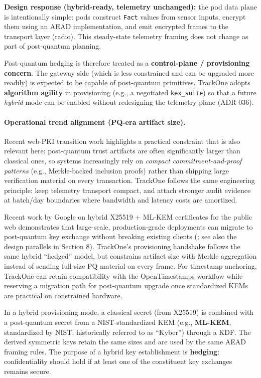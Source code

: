 \textbf{Design response (hybrid-ready, telemetry unchanged):}
the pod data plane is intentionally simple: pods construct \texttt{Fact} values from sensor inputs, encrypt them using
an \ac{AEAD} implementation, and emit encrypted frames to the transport layer (radio).
This steady-state telemetry framing
does not change as part of post-quantum planning.

Post-quantum hedging is therefore treated as a \textbf{control-plane / provisioning concern}. The gateway side (which is
less constrained and can be upgraded more readily) is expected to be capable of post-quantum primitives. TrackOne
adopts \textbf{algorithm agility} in provisioning (e.g., a negotiated \texttt{kex\_suite}) so that a future \emph{hybrid}
mode can be enabled without redesigning the telemetry plane (ADR-036).

\paragraph{Operational trend alignment (PQ-era artifact size).}
Recent web-PKI transition work highlights a practical constraint that is also relevant here:
post-quantum trust artifacts are often significantly larger than classical ones, so systems increasingly rely on
\emph{compact commitment-and-proof patterns} (e.g., Merkle-backed inclusion proofs) rather than shipping large
verification material on every transaction.
TrackOne follows the same engineering principle:
keep telemetry transport compact, and attach stronger audit evidence at batch/day boundaries where bandwidth and
latency costs are amortized.

Recent work by Google on hybrid X25519 + ML-KEM certificates for the public
web demonstrates that large-scale, production-grade deployments can migrate to
post-quantum key exchange without breaking existing clients
(\cite{ars2026_google_pq_https}; see also the design parallels in
\cite{rfc9162} Section 8). TrackOne's provisioning handshake follows the same
hybrid ``hedged'' model, but constrains artifact size with Merkle aggregation
instead of sending full-size PQ material on every frame. For timestamp
anchoring, TrackOne can retain compatibility with the OpenTimestamps workflow
\cite{opentimestamps} while reserving a migration path for post-quantum upgrade
once standardized KEMs are practical on constrained hardware.

In a hybrid provisioning mode, a classical secret (from X25519) is combined with a post-quantum secret from a
NIST-standardized KEM (e.g., \textbf{ML-KEM}, standardized by NIST; historically referred to as ``Kyber'') through a KDF.
The derived symmetric keys retain the same sizes and are used by the same \ac{AEAD} framing rules.
The purpose of a hybrid
key establishment is \textbf{hedging}: confidentiality should hold if at least one of the constituent key exchanges
remains secure.

